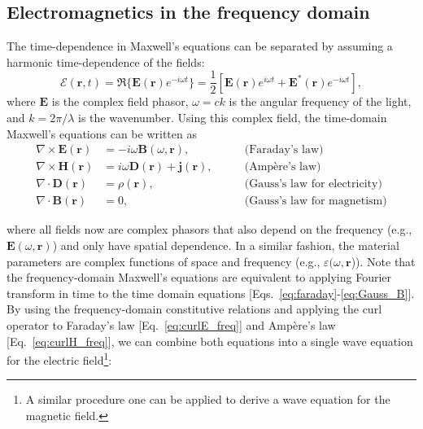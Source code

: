 \subsection*{Electromagnetics in the frequency domain}

The time-dependence in Maxwell's equations can be separated by assuming a harmonic time-dependence of the fields:
\begin{equation}
    \bm{\mathcal{E}}(\mathbf{r}, t) = \Re \{ \mathbf{E}(\mathbf{r}) e^{-i\omega t} \}= \frac{1}{2}\left[ \mathbf{E}(\mathbf{r}) e^{i\omega t} + \mathbf{E}^*(\mathbf{r}) e^{-i\omega t}\right],
\end{equation}
where $\mathbf{E}$ is the complex field phasor, $\omega=ck$ is the angular frequency of the light, and $k=2\pi/\lambda$ is the wavenumber.
Using this complex field, the time-domain Maxwell's equations can be written as
\begin{align}
    \nabla \times \mathbf{E}(\mathbf{r}) &= -i\omega \mathbf{B}(\omega, \mathbf{r}), \quad \quad &\text{(Faraday's law)} \label{eq:curlE_freq}\\
    \nabla \times \mathbf{H}(\mathbf{r}) &= i\omega  \mathbf{D}(\mathbf{r}) + \mathbf{j}(\mathbf{r}), \quad \quad &\text{(Ampère's law)} \label{eq:curlH_freq}\\
    \nabla \cdot \mathbf{D}(\mathbf{r}) &= \rho(\mathbf{r}), \quad \quad &\text{(Gauss's law for electricity)} \label{eq:divD_freq}\\
    \nabla \cdot \mathbf{B}(\mathbf{r}) &= 0, \quad \quad &\text{(Gauss's law for magnetism)} \label{eq:divB_freq}
\end{align}

where all fields now are complex phasors that also depend on the frequency
(e.g., $\mathbf{E}(\omega, \mathbf{r})$) and only have spatial dependence. In a similar fashion,
the material parameters are complex functions of space and frequency (e.g., $\varepsilon(\omega, \mathbf{r}$)). 
Note that the frequency-domain Maxwell's equations are equivalent to applying Fourier transform in time to the time domain
equations [Eqs.~\eqref{eq:faraday}-\eqref{eq:Gauss_B}].\\

By using the frequency-domain constitutive relations and applying the curl operator to Faraday's law [Eq.~\eqref{eq:curlE_freq}] and Ampère's law [Eq.~\eqref{eq:curlH_freq}],
we can combine both equations into a single wave equation for the electric field\footnote{A similar procedure one can be applied to derive a wave equation for the magnetic field.
}:

